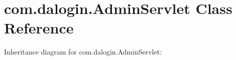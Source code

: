\hypertarget{classcom_1_1dalogin_1_1_admin_servlet}{}\section{com.\+dalogin.\+Admin\+Servlet Class Reference}
\label{classcom_1_1dalogin_1_1_admin_servlet}


Inheritance diagram for com.\+dalogin.\+Admin\+Servlet\+:
